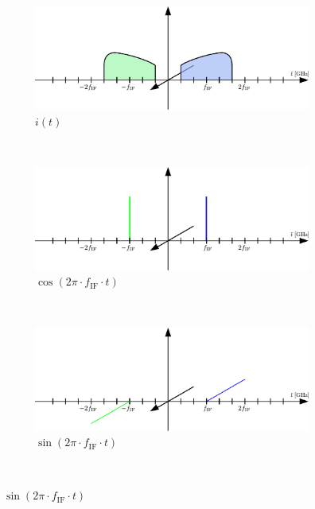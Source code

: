\begin{figure}[p]
  \centering
  \begin{subfigure}{0.45\textwidth}
    \centering
    \includegraphics[width=\textwidth]{figures/rx_adc_1_freq_i}
    \caption{$i(t)$}
    \label{fig:rx_adc_1_freq_s}
  \end{subfigure}
  \vspace{4ex} \\
  \begin{subfigure}{0.45\textwidth}
    \centering
    \includegraphics[width=\textwidth]{figures/rx_adc_1_freq_cos}
    \caption{$\cos(2\pi \cdot f_{\text{IF}} \cdot t)$}
    \label{fig:rx_adc_1_freq_cos}
  \end{subfigure}
  ~
  \begin{subfigure}{0.45\textwidth}
    \centering
    \includegraphics[width=\textwidth]{figures/rx_adc_1_freq_sin}
    \caption{$\sin(2\pi \cdot f_{\text{IF}} \cdot t)$}
    \label{fig:rx_adc_1_freq_sin}
  \end{subfigure}
  \vspace{4ex} \\

\end{figure}
